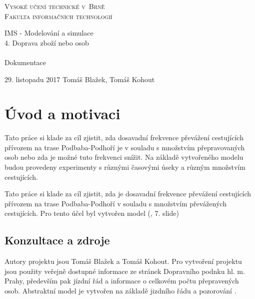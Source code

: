 \documentclass[11pt,a4paper]{article}
\author{Tomáš Kohout, Tomáš Blažek}
\begin{document}

\newcommand{\slideRef}[1]{\textit{(IMS slide #1)}}
\newcommand{\code}[1]{\texttt{#1}}

	\begin{titlepage}

		\begin{center}

			\textsc{
				\Huge
					Vysoké učení technické v~Brně\\
				\huge
					Fakulta informačních technologií
			}\\


			\LARGE
					IMS - Modelování a simulace\\
					4. Doprava zboží nebo osob\\~\\
			\Huge{}
					Dokumentace

		\end{center}

		{\Large
			29. listopadu 2017
			\hfill
			Tomáš Blažek, Tomáš Kohout
		}

	\end{titlepage}

	\tableofcontents

	\pagebreak


	\section{Úvod a motivaci}
	Tato práce si klade za cíl zjistit, zda dosavadní frekvence převážení cestujících přívozem na trase Podbaba-Podhoří je v
  souladu s množstvím přepravovaných osob nebo zda je možné tuto frekvenci snížit. Na základě vytvořeného modelu
  budou provedeny experimenty s různými časovými úseky a různým množstvím cestujících.

  Tato práce si klade za cíl zjistit, zda je dosavadní frekvence převážení cestujících přívozem na trase Podbaba-Podhoří
  v souladu s množstvím převážených cestujících. Pro tento účel byl vytvořen model (\cite{SLAJD}, 7. slide)

	\subsection{Konzultace a zdroje}
	Autory projektu jsou Tomáš Blažek a Tomáš Kohout. Pro vytvoření projektu jsou použity veřejně dostupné informace ze stránek Dopravního podnku hl. m. Prahy, především pak jízdní řád a informace o celkovém počtu přepravených osob. Abstraktní model je vytvořen na základě jizdního řádu a pozorování .
\end{document}
